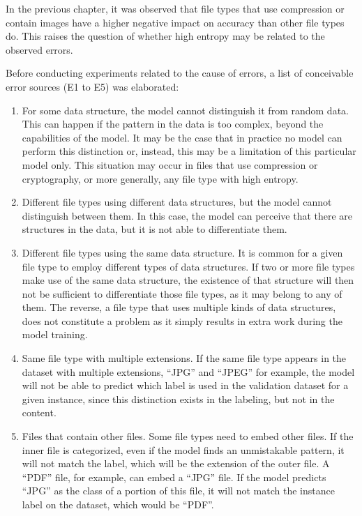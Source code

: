 In the previous chapter, it was observed that file types that use compression or contain images have a higher negative impact on accuracy than other file types do. This raises the question of whether high entropy may be related to the observed errors.

Before conducting experiments related to the cause of errors, a list of conceivable error sources (E1 to E5) was elaborated:
\begin{enumerate}[itemindent=\parindent,label=\textbf{E\arabic*.}]
    \item For some data structure, the model cannot distinguish it from random data. This can happen if the pattern in the data is too complex, beyond the capabilities of the model. It may be the case that in practice no model can perform this distinction or, instead, this may be a limitation of this particular model only. This situation may occur in files that use compression or cryptography, or more generally, any file type with high entropy.
    
    \item Different file types using different data structures, but the model cannot distinguish between them. In this case, the model can perceive that there are structures in the data, but it is not able to differentiate them.

    \item Different file types using the same data structure. It is common for a given file type to employ different types of data structures. If two or more file types make use of the same data structure, the existence of that structure will then not be sufficient to differentiate those file types, as it may belong to any of them.
    The reverse, a file type that uses multiple kinds of data structures, does not constitute a problem as it simply results in extra work during the model training.

    \item Same file type with multiple extensions. If the same file type appears in the dataset with multiple extensions, ``JPG'' and ``JPEG'' for example, the model will not be able to predict which label is used in the validation dataset for a given instance, since this distinction exists in the labeling, but not in the content.

    \item Files that contain other files. Some file types need to embed other files. If the inner file is categorized, even if the model finds an unmistakable pattern, it will not match the label, which will be the extension of the outer file. A ``PDF'' file, for example, can embed a ``JPG'' file. If the model predicts ``JPG'' as the class of a portion of this file, it will not match the instance label on the dataset, which would be ``PDF''.
\end{enumerate}

